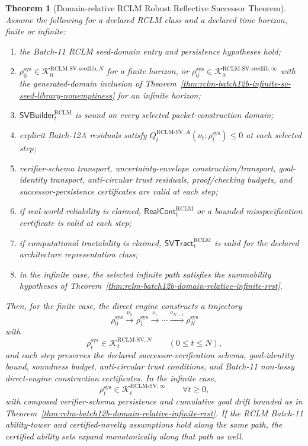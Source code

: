 \documentclass[11pt,a4paper]{article}
\newtheorem{theorem}{Theorem}[section]
\newcommand{\Kcal}{\mathcal K}
\newcommand{\RCLM}{\mathrm{RCLM}}
\newcommand{\sys}{\mathrm{sys}}
\begin{document}
\begin{theorem}[Domain-relative RCLM Robust Reflective Successor Theorem]
\label{thm:rclm-batch12b-combined-domain-relative-rrst}
Assume the following for a declared RCLM class and a declared time horizon, finite or infinite:
\begin{enumerate}[label=(\roman*),leftmargin=1.5em]
    \item the Batch-11 RCLM seed-domain entry and persistence hypotheses hold;
    \item \(\rho_0^{\sys}\in\Kcal_0^{\RCLM\text{-}\mathrm{SV\mbox{-}seedlib},N}\) for a finite horizon, or \(\rho_0^{\sys}\in\Kcal_0^{\RCLM\text{-}\mathrm{SV\mbox{-}seedlib},\infty}\) with the generated-domain inclusion of Theorem~\ref{thm:rclm-batch12b-infinite-sv-seed-library-nonemptiness} for an infinite horizon;
    \item \(\mathsf{SVBuilder}_t^{\RCLM}\) is sound on every selected packet-construction domain;
    \item explicit Batch-12A residuals satisfy \(Q_t^{\RCLM\text{-}\mathrm{SV},A}(\nu_t;\rho_t^{\sys})\le0\) at each selected step;
    \item verifier-schema transport, uncertainty-envelope construction/transport, goal-identity transport, anti-circular trust residuals, proof/checking budgets, and successor-persistence certificates are valid at each step;
    \item if real-world reliability is claimed, \(\mathsf{RealCont}_t^{\RCLM}\) or a bounded misspecification certificate is valid at each step;
    \item if computational tractability is claimed, \(\mathsf{SVTract}_t^{\RCLM}\) is valid for the declared architecture representation class;
    \item in the infinite case, the selected infinite path satisfies the summability hypotheses of Theorem~\ref{thm:rclm-batch12b-domain-relative-infinite-rrst}.
\end{enumerate}
Then, for the finite case, the direct engine constructs a trajectory
\[
\rho_0^{\sys}\xrightarrow{\nu_0}\rho_1^{\sys}\xrightarrow{\nu_1}\cdots\xrightarrow{\nu_{N-1}}\rho_N^{\sys}
\]
with
\[
\rho_t^{\sys}\in\Kcal_t^{\RCLM\text{-}\mathrm{SV},N}
\qquad(0\le t\le N),
\]
and each step preserves the declared successor-verification schema, goal-identity bound, soundness budget, anti-circular trust conditions, and Batch-11 non-lossy direct-engine construction certificates. In the infinite case,
\[
\rho_t^{\sys}\in\Kcal_t^{\RCLM\text{-}\mathrm{SV},\infty}
\qquad\forall t\ge0,
\]
with composed verifier-schema persistence and cumulative goal drift bounded as in Theorem~\ref{thm:rclm-batch12b-domain-relative-infinite-rrst}. If the RCLM Batch-11 ability-tower and certified-novelty assumptions hold along the same path, the certified ability sets expand monotonically along that path as well.
\end{theorem}
\end{document}
